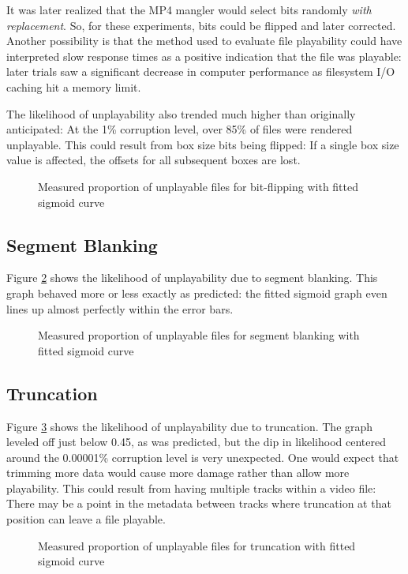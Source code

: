 It was later realized that the MP4 mangler would select bits randomly \emph{with replacement}. So, for these experiments, bits could be flipped and later corrected. Another possibility is that the method used to evaluate file playability could have interpreted slow response times as a positive indication that the file was playable: later trials saw a significant decrease in computer performance as filesystem I/O caching hit a memory limit.

The likelihood of unplayability also trended much higher than originally anticipated: At the 1\% corruption level, over 85\% of files were rendered unplayable. This could result from box size bits being flipped: If a single box size value is affected, the offsets for all subsequent boxes are lost.

\begin{figure}
    \begin{center}
        
    \end{center}
    \caption{Measured proportion of unplayable files for bit-flipping with fitted sigmoid curve}
    \label{fig:flip-results}
\end{figure}

\subsection{Segment Blanking}

Figure \ref{fig:blank-results} shows the likelihood of unplayability due to segment blanking. This graph behaved more or less exactly as predicted: the fitted sigmoid graph even lines up almost perfectly within the error bars.

\begin{figure}
    \begin{center}
        
    \end{center}
    \caption{Measured proportion of unplayable files for segment blanking with fitted sigmoid curve}
    \label{fig:blank-results}
\end{figure}

\subsection{Truncation}

Figure \ref{fig:trunc-results} shows the likelihood of unplayability due to truncation. The graph leveled off just below 0.45, as was predicted, but the dip in likelihood centered around the 0.00001\% corruption level is very unexpected. One would expect that trimming more data would cause more damage rather than allow more playability. This could result from having multiple tracks within a video file: There may be a point in the metadata between tracks where truncation at that position can leave a file playable.

\begin{figure}
    \begin{center}
        
    \end{center}
    \caption{Measured proportion of unplayable files for truncation with fitted sigmoid curve}
    \label{fig:trunc-results}
\end{figure}